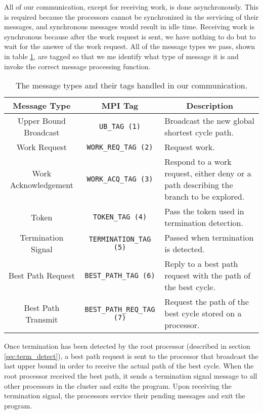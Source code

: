 \documentclass{article}
\begin{document}
All of our communication, except for receiving work, is done asynchronously. 
This is required because the processors cannot be synchronized in the servicing
of their messages, and synchronous messages would result in idle time. 
Receiving work is synchronous because after the work request is sent, we have
nothing to do but to wait for the answer of the work request.  All of the
message types we pass, shown in table \ref{tab:msg_tags}, are tagged so that we me
identify what type of message it is and invoke the correct message processing
function.


\begin{table}
	\centering
	\begin{tabular}{|c|c|p{4cm}|}
	\hline
	{\small Message Type} 			& {\small MPI Tag}								& \multicolumn{1}{|c|}{Description} \\ \hline
	{\small Upper Bound Broadcast}	& {\small \texttt{UB\_TAG (1)}}					& {\small Broadcast the new global shortest cycle path.} \\ \hline
	{\small Work Request}			& {\small \texttt{WORK\_REQ\_TAG (2)}}			& {\small Request work.} \\ \hline
	{\small Work Acknowledgement}	& {\small \texttt{WORK\_ACQ\_TAG (3)}}			& {\small Respond to a work request, either deny or a path describing the branch to be explored.} \\ \hline
	{\small Token}					& {\small \texttt{TOKEN\_TAG (4)}}				& {\small Pass the token used in termination detection.} \\ \hline
	{\small Termination Signal}		& {\small \texttt{TERMINATION\_TAG (5)}}		& {\small Passed when termination is detected.} \\ \hline
	{\small Best Path Request}		& {\small \texttt{BEST\_PATH\_TAG (6)}}			& {\small Reply to a best path request with the path of the best cycle.} \\ \hline
	{\small Best Path Transmit}		& {\small \texttt{BEST\_PATH\_REQ\_TAG (7)}}	& {\small Request the path of the best cycle stored on a processor.} \\ \hline
	
	
	\end{tabular}
	\caption{The message types and their tags handled in our communication.}
	\label{tab:msg_tags}
\end{table}

Once termination has been detected by the root processor (described in section \ref{sec:term_detect}), a best path request
is sent to the processor that broadcast the last upper bound in order to receive the actual path of the 
best cycle.  When the root processor received the best path, it sends a termination signal message to all other processors
in the cluster and exits the program.  Upon receiving the termination signal, the processors service their pending messages
and exit the program.
\end{document}
